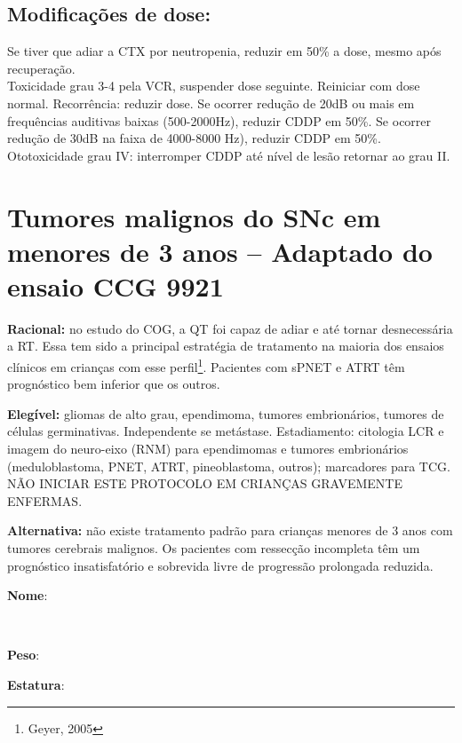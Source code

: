 \documentclass[11pt,a4paper,oldfontcommands]{memoir}
\def\entrywithlabel[#1]#2{\parbox{#1}{{\small #2:} \hrulefill}}
\begin{document}
\subsection{Modificações de dose:}
Se tiver que adiar a CTX por neutropenia, reduzir em 50\% a dose, mesmo após recuperação.\\
Toxicidade grau 3-4 pela VCR, suspender dose seguinte. Reiniciar com dose normal. Recorrência: reduzir dose.
Se ocorrer redução de 20dB ou mais em frequências auditivas baixas (500-2000Hz), reduzir CDDP em 50\%. Se ocorrer redução de 30dB na faixa de 4000-8000 Hz), reduzir CDDP em 50\%. Ototoxicidade grau IV: interromper CDDP até nível de lesão retornar ao grau II.\\
\cleardoublepage
\section{Tumores malignos do SNc em menores de 3 anos -- Adaptado do ensaio CCG 9921}
{\let\thefootnote\relax{}}
\small
\textbf{Racional:} no estudo do COG, a QT foi capaz de adiar e até tornar desnecessária a RT. Essa tem sido a principal estratégia de tratamento na maioria dos ensaios clínicos em crianças com esse perfil\footnote{Geyer, 2005}. Pacientes com sPNET e ATRT têm prognóstico bem inferior que os outros.

\textbf{Elegível:} gliomas de alto grau, ependimoma, tumores embrionários, tumores de células germinativas. Independente se metástase. Estadiamento: citologia LCR e imagem do neuro-eixo (RNM) para ependimomas e tumores embrionários (meduloblastoma, PNET, ATRT, pineoblastoma, outros); marcadores para TCG. NÃO INICIAR ESTE PROTOCOLO EM CRIANÇAS GRAVEMENTE ENFERMAS.

\textbf{Alternativa:} não existe tratamento padrão para crianças menores de 3 anos com tumores cerebrais malignos. Os pacientes com ressecção incompleta têm um prognóstico insatisfatório e sobrevida livre de progressão prolongada reduzida.
\\[0.4cm]
\entrywithlabel[1\hsize]{\textbf{Nome}}\hfill
\\[0.3cm]
\entrywithlabel[.45\hsize]{\textbf{Peso}}\hfill  \entrywithlabel[.45\hsize]{\textbf{Estatura}}
\end{document}
